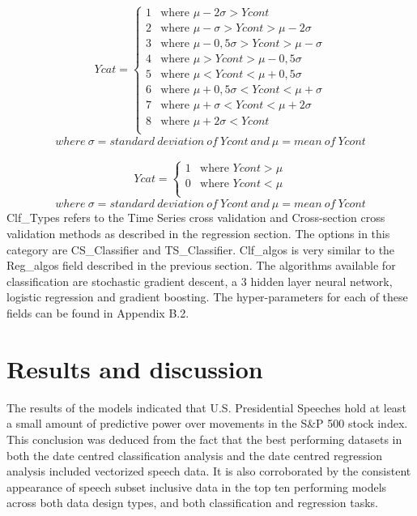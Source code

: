 \documentclass[11pt,preprint, authoryear]{elsarticle}
\numberwithin{equation}{section}
\numberwithin{figure}{section}
\numberwithin{table}{section}
\begin{document}
\begin{align} 
Ycat=   \left\{ 
\begin{array}{ll} 
      1  &\text{where } \mu-2\sigma>Ycont \label{eq1} \\
      2  &\text{where } \mu-\sigma>Ycont>\mu-2\sigma \\
      3  &\text{where } \mu-0,5\sigma>Ycont>\mu-\sigma \\
      4  &\text{where } \mu>Ycont>\mu-0,5\sigma \\
      5  &\text{where } \mu<Ycont<\mu+0,5\sigma \\
      6  &\text{where } \mu+0,5\sigma<Ycont<\mu+\sigma \\
      7  &\text{where } \mu+\sigma<Ycont<\mu+2\sigma \\
      8  &\text{where } \mu+2\sigma<Ycont \\
\end{array} 
\right. 
\end{align} \[
where \ \sigma = standard \ deviation \ of \ Ycont \ and \ \mu = mean \ of \ Ycont
\]

\begin{align}
Ycat=   \left\{ 
\begin{array}{ll} 
      1  &\text{where } Ycont>\mu \label{eq2} \\
      0  &\text{where } Ycont<\mu \\
\end{array} 
\right. 
\end{align} \[
where \ \sigma = standard \ deviation \ of \ Ycont \ and \ \mu = mean \ of \ Ycont
\] Clf\_Types refers to the Time Series cross validation and
Cross-section cross validation methods as described in the regression
section. The options in this category are CS\_Classifier and
TS\_Classifier. Clf\_algos is very similar to the Reg\_algos field
described in the previous section. The algorithms available for
classification are stochastic gradient descent, a 3 hidden layer neural
network, logistic regression and gradient boosting. The hyper-parameters
for each of these fields can be found in Appendix B.2.

\hypertarget{results-and-discussion}{%
\section{Results and discussion}\label{results-and-discussion}}

The results of the models indicated that U.S. Presidential Speeches hold
at least a small amount of predictive power over movements in the S\&P
500 stock index. This conclusion was deduced from the fact that the best
performing datasets in both the date centred classification analysis and
the date centred regression analysis included vectorized speech data. It
is also corroborated by the consistent appearance of speech subset
inclusive data in the top ten performing models across both data design
types, and both classification and regression tasks.
\end{document}
